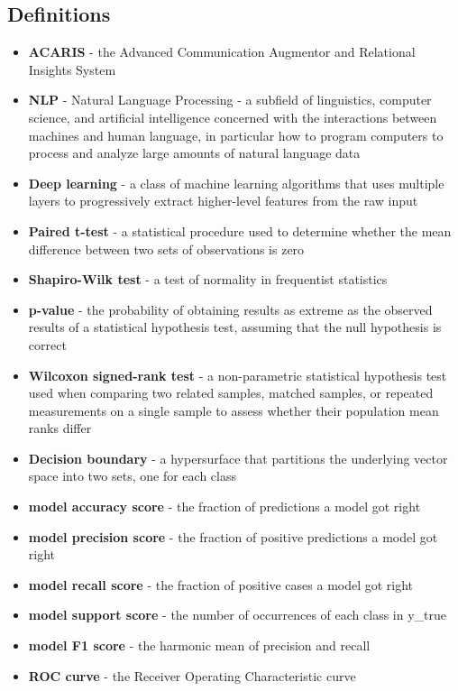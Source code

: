 \documentclass{article}
\begin{document}
\subsection{Definitions}
\begin{itemize}
	\item \textbf{ACARIS} - the Advanced Communication Augmentor and Relational Insights System
	\item \textbf{NLP} - Natural Language Processing - a subfield of linguistics, computer science, and artificial intelligence concerned with the interactions between machines and human language, in particular how to program computers to process and analyze large amounts of natural language data
	\item \textbf{Deep learning} - a class of machine learning algorithms that uses multiple layers to progressively extract higher-level features from the raw input
	\item \textbf{Paired t-test} - a statistical procedure used to determine whether the mean difference between two sets of observations is zero
	\item \textbf{Shapiro-Wilk test} - a test of normality in frequentist statistics
	\item \textbf{p-value} - the probability of obtaining results as extreme as the observed results of a statistical hypothesis test, assuming that the null hypothesis is correct
	\item \textbf{Wilcoxon signed-rank test} - a non-parametric statistical hypothesis test used when comparing two related samples, matched samples, or repeated measurements on a single sample to assess whether their population mean ranks differ
	\item \textbf{Decision boundary} - a hypersurface that partitions the underlying vector space into two sets, one for each class
	\item \textbf{model accuracy score} - the fraction of predictions a model got right
	\item \textbf{model precision score} - the fraction of positive predictions a model got right
	\item \textbf{model recall score} - the fraction of positive cases a model got right
	\item \textbf{model support score} - the number of occurrences of each class in y\_true
	\item \textbf{model F1 score} - the harmonic mean of precision and recall
	\item \textbf{ROC curve} - the Receiver Operating Characteristic curve

\end{itemize}
\end{document}
